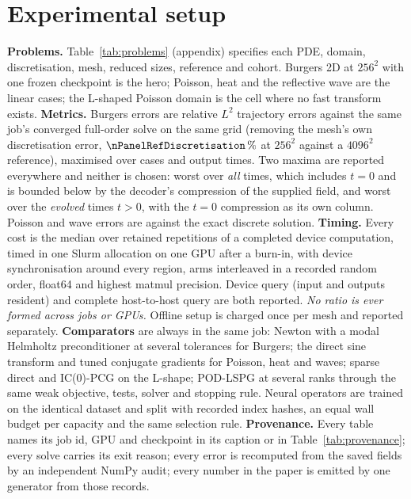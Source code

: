 \section{Experimental setup}
\label{sec:setup}

\textbf{Problems.} Table~\ref{tab:problems} (appendix) specifies each PDE,
domain, discretisation, mesh, reduced sizes, reference and cohort. Burgers 2D
at $256^2$ with one frozen checkpoint is the hero; Poisson, heat and the
reflective wave are the linear cases; the L-shaped Poisson domain is the cell
where no fast transform exists.
\textbf{Metrics.} Burgers errors are relative $L^2$ trajectory errors against
the same job's converged full-order solve on the same grid (removing the
mesh's own discretisation error, $\nPanelRefDiscretisation\,\%$ at $256^2$
against a $4096^2$ reference), maximised over cases and output times. Two
maxima are reported everywhere and neither is chosen: worst over \emph{all}
times, which includes $t=0$ and is bounded below by the decoder's compression
of the supplied field, and worst over the \emph{evolved} times $t>0$, with the
$t=0$ compression as its own column. Poisson and wave errors are against the
exact discrete solution.
\textbf{Timing.} Every cost is the median over retained repetitions of a
completed device computation, timed in one Slurm allocation on one GPU after a
burn-in, with device synchronisation around every region, arms interleaved in a
recorded random order, float64 and highest matmul precision. Device query
(input and outputs resident) and complete host-to-host query are both reported.
\emph{No ratio is ever formed across jobs or GPUs.} Offline setup is charged
once per mesh and reported separately.
\textbf{Comparators} are always in the same job: Newton with a modal Helmholtz
preconditioner at several tolerances for Burgers; the direct sine transform
and tuned conjugate gradients for Poisson, heat and waves; sparse direct and
IC(0)-PCG on the L-shape; POD-LSPG at several ranks through the same weak
objective, tests, solver and stopping rule. Neural operators are trained on
the identical dataset and split with recorded index hashes, an equal wall
budget per capacity and the same selection rule.
\textbf{Provenance.} Every table names its job id, GPU and checkpoint in its
caption or in Table~\ref{tab:provenance}; every solve carries its exit reason;
every error is recomputed from the saved fields by an independent NumPy audit;
every number in the paper is emitted by one generator from those records.
